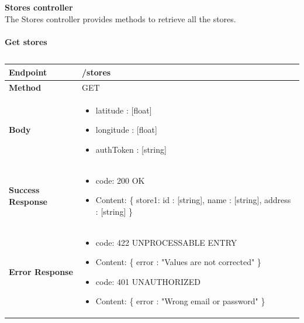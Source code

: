 \documentclass[a4paper, 12pt, oneside, table]{article}
\begin{document}
\textbf{\large Stores controller}\\
The Stores controller provides methods to retrieve all the stores.\\
\\
\textbf{Get stores}
\vspace{-2em}
\begin{tabularx}{0.8\textwidth} { 
  | >{\raggedright\arraybackslash}X 
  | >{\centering\arraybackslash}X 
  | >{\raggedleft\arraybackslash}X | }
 \hline

 \hline
 
\hline
\hline
 
\hline
\end{tabularx}

\begin{tabularx}{\linewidth}{| l | X |}
    
    \hline
     \textbf{Endpoint} & /stores \\
    

    \hline
    \textbf{Method}  & GET   \\
    
    \hline
    \textbf{Body}  & \parbox{0.7\textwidth}{ \begin{itemize}[label={}] 
                \item latitude : [float]
                 \item longitude : [float]
                 \item authToken : [string]
               \end{itemize}}\\
    
    \hline
    \textbf{Success Response} & \parbox{0.7\textwidth}{ \begin{itemize}[label={}] 
                \item code: 200 OK
                 \item Content: \{ 
                   store1:{
                    id : [string],
                    name : [string],
                    address : [string]
                   }
                 \}
               \end{itemize}}\\
    
    \hline
    
    \hline
        \textbf{Error Response} & \parbox{0.7\textwidth}{ \begin{itemize}[label={}] 
                \item code: 422 UNPROCESSABLE ENTRY
                 \item Content: \{ error : "Values are not corrected" \}
                  \item code: 401 UNAUTHORIZED
                 \item Content: \{ error : "Wrong email or password" \}
               \end{itemize}}\\
    

\end{tabularx}
\end{document}

